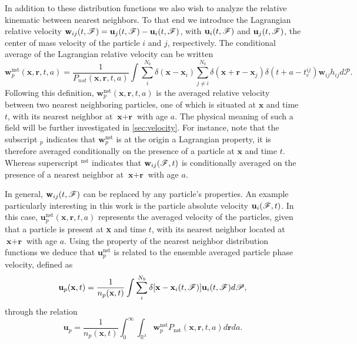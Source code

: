 In addition to these distribution functions we also wish to analyze the relative kinematic between nearest neighbors. 
To that end we introduce the Lagrangian relative velocity $\textbf{w}_{ij}(t,\mathscr{F}) = \textbf{u}_j(t,\mathscr{F}) - \textbf{u}_i(t,\mathscr{F})$, with $\textbf{u}_i(t,\mathscr{F})$ and $\textbf{u}_j(t,\mathscr{F})$, the center of mass velocity of the particle $i$ and $j$, respectively.
The conditional average of the Lagrangian relative velocity can be written
\begin{equation*}
    \textbf{w}^\text{nst}_p (\textbf{x},\textbf{r},t,a)
    = 
    \frac{1}{P_{nst}(\textbf{x},\textbf{r},t,a)}
    \int \sum_{i}^{N_b}\delta(\textbf{x}-\textbf{x}_i)
    \sum_{j\neq i}^{N_b}\delta(\textbf{x}+\textbf{r}-\textbf{x}_j) 
    \delta(t+a-t_c^{ij}) 
    \textbf{w}_{ij}
    h_{ij} 
    d\mathscr{P}.
    \label{eq:q_nstij}
\end{equation*}
Following this definition, $\textbf{w}^\text{nst}_p(\textbf{x},\textbf{r},t,a)$ is the averaged relative velocity between two nearest neighboring particles, one of which is situated at $\textbf{x}$ and time $t$, with its nearest neighbor at $\textbf{x}+\textbf{r}$ with age $a$. 
The physical meaning of such a field will be further investigated in \ref{sec:velocity}. 
For instance, note that the subscript $_p$ indicates that $\textbf{w}^\text{nst}_p$ is at the origin a Lagrangian property, it is therefore averaged conditionally on the presence of a particle at $\textbf{x}$ and time $t$. 
Whereas superscript $^\text{nst}$ indicates that $\textbf{w}_{ij}(\mathscr{F},t)$ is conditionally averaged on the presence of a nearest neighbor at $\textbf{x}+\textbf{r}$ with age $a$. 

In general, $\textbf{w}_{ij}(t,\mathscr{F})$ can be replaced by any particle's properties. 
An example particularly interesting in this work is the particle absolute velocity $\textbf{u}_i(\mathscr{F},t)$.
In this case, $\textbf{u}^\text{nst}_p(\textbf{x},\textbf{r},t,a)$ represents the averaged velocity of the particles, given that a particle is present at \textbf{x} and time $t$, with its nearest neighbor located at $\textbf{x}+\textbf{r}$ with age $a$. 
Using the property of the nearest neighbor distribution functions we deduce that  $\textbf{u}^\text{nst}_p$ is related to the ensemble averaged particle phase velocity, defined as 
\begin{equation*}
    \textbf{u}_p(\textbf{x},t)=\frac{1}{n_p(\textbf{x},t)} 
    \int \sum_{i}^{N_b}\delta[\textbf{x}-\textbf{x}_i(t,\mathscr{F})]  \textbf{u}_i(t,\mathscr{F})d\mathscr{P},
\end{equation*}
through the relation
\begin{equation}
    \textbf{u}_p = \frac{1}{n_p(\textbf{x},t)} \int_0^\infty \int_{\mathbb{R}^3} \textbf{w}_p^\text{nst} P_\text{nst}(\textbf{x},\textbf{r},t,a) d\textbf{r} da. 
    \label{eq:u_p}
\end{equation}



